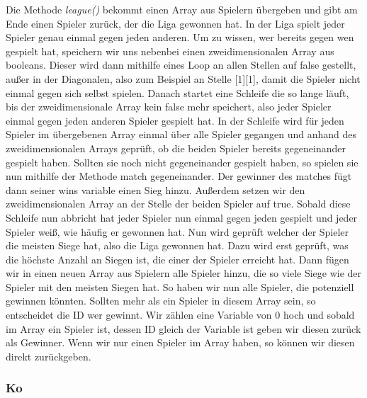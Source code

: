\documentclass[a4paper, 12pt]{scrartcl}
\begin{document}
Die Methode \emph{league()} bekommt einen Array aus Spielern übergeben und gibt am Ende einen Spieler zurück, der die Liga gewonnen hat. In der Liga spielt jeder Spieler genau einmal gegen jeden anderen. Um zu wissen, wer bereits gegen wen gespielt hat, speichern wir uns nebenbei einen zweidimensionalen Array aus booleans. Dieser wird dann mithilfe eines Loop an allen Stellen auf false gestellt, außer in der Diagonalen, also zum Beispiel an Stelle [1][1], damit die Spieler nicht einmal gegen sich selbst spielen. Danach startet eine Schleife die so lange läuft, bis der zweidimensionale Array kein false mehr speichert, also jeder Spieler einmal gegen jeden anderen Spieler gespielt hat. In der Schleife wird für jeden Spieler im übergebenen Array einmal über alle Spieler gegangen und anhand des zweidimensionalen Arrays geprüft, ob die beiden Spieler bereits gegeneinander gespielt haben. Sollten sie noch nicht gegeneinander gespielt haben, so spielen sie nun mithilfe der Methode match gegeneinander. Der gewinner des matches fügt dann seiner wins variable einen Sieg hinzu. Außerdem setzen wir den zweidimensionalen Array an der Stelle der beiden Spieler auf true. Sobald diese Schleife nun abbricht hat jeder Spieler nun einmal gegen jeden gespielt und jeder Spieler weiß, wie häufig er gewonnen hat. Nun wird geprüft welcher der Spieler die meisten Siege hat, also die Liga gewonnen hat. Dazu wird erst geprüft, was die höchste Anzahl an Siegen ist, die einer der Spieler erreicht hat. Dann fügen wir in einen neuen Array aus Spielern alle Spieler hinzu, die so viele Siege wie der Spieler mit den meisten Siegen hat. So haben wir nun alle Spieler, die potenziell gewinnen könnten. Sollten mehr als ein Spieler in diesem Array sein, so entscheidet die ID wer gewinnt. Wir zählen eine Variable von 0 hoch und sobald im Array ein Spieler ist, dessen ID gleich der Variable ist geben wir diesen zurück als Gewinner. Wenn wir nur einen Spieler im Array haben, so können wir diesen direkt zurückgeben.

\subsubsection{Ko}
\end{document}
